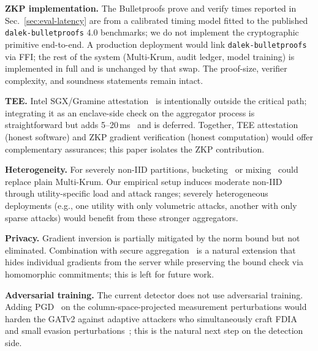 \documentclass[conference]{IEEEtran}
\begin{document}
\textbf{ZKP implementation.} The Bulletproofs prove and verify times reported in Sec.~\ref{sec:eval-latency} are from a calibrated timing model fitted to the published \texttt{dalek-bulletproofs} 4.0 benchmarks; we do not implement the cryptographic primitive end-to-end. A production deployment would link \texttt{dalek-bulletproofs} via FFI; the rest of the system (Multi-Krum, audit ledger, model training) is implemented in full and is unchanged by that swap. The proof-size, verifier complexity, and soundness statements remain intact.

\textbf{TEE.} Intel SGX/Gramine attestation~\cite{costan2016sgx,tsai2017graphenesgx,mo2021ppfl} is intentionally outside the critical path; integrating it as an enclave-side check on the aggregator process is straightforward but adds 5--20\,ms~\cite{tramer2019slalom} and is deferred. Together, TEE attestation (honest software) and ZKP gradient verification (honest computation) would offer complementary assurances; this paper isolates the ZKP contribution.

\textbf{Heterogeneity.} For severely non-IID partitions, bucketing~\cite{karimireddy2022bucketing} or mixing~\cite{allouah2023fixing} could replace plain Multi-Krum. Our empirical setup induces moderate non-IID through utility-specific load and attack ranges; severely heterogeneous deployments (e.g., one utility with only volumetric attacks, another with only sparse attacks) would benefit from these stronger aggregators.

\textbf{Privacy.} Gradient inversion is partially mitigated by the norm bound but not eliminated. Combination with secure aggregation~\cite{bonawitz2017secure,bell2020secagg,bell2023acorn} is a natural extension that hides individual gradients from the server while preserving the bound check via homomorphic commitments; this is left for future work.

\textbf{Adversarial training.} The current detector does not use adversarial training. Adding PGD~\cite{madry2018pgd} on the column-space-projected measurement perturbations would harden the GATv2 against adaptive attackers who simultaneously craft FDIA and small evasion perturbations~\cite{li2021adversarialresilient,tian2024lesson}; this is the natural next step on the detection side.
\end{document}
